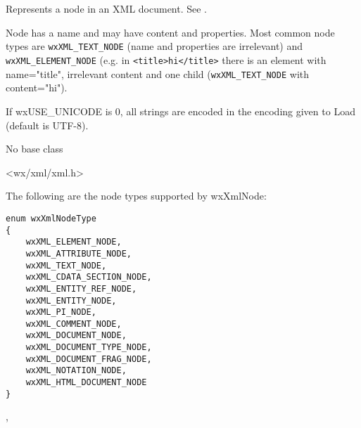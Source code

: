 \section{}\label{wxxmlnode}

Represents a node in an XML document. See .

Node has a name and may have content
and properties. Most common node types are {\tt wxXML\_TEXT\_NODE} (name and
properties are irrelevant) and {\tt wxXML\_ELEMENT\_NODE} (e.g. in {\tt <title>hi</title>} there is
an element with name="title", irrelevant content and one child ({\tt wxXML\_TEXT\_NODE}
with content="hi").

If wxUSE\_UNICODE is 0, all strings are encoded in the encoding given to Load
(default is UTF-8).



No base class


<wx/xml/xml.h>


The following are the node types supported by wxXmlNode:

{\small
\begin{verbatim}
enum wxXmlNodeType
{
    wxXML_ELEMENT_NODE,
    wxXML_ATTRIBUTE_NODE,
    wxXML_TEXT_NODE,
    wxXML_CDATA_SECTION_NODE,
    wxXML_ENTITY_REF_NODE,
    wxXML_ENTITY_NODE,
    wxXML_PI_NODE,
    wxXML_COMMENT_NODE,
    wxXML_DOCUMENT_NODE,
    wxXML_DOCUMENT_TYPE_NODE,
    wxXML_DOCUMENT_FRAG_NODE,
    wxXML_NOTATION_NODE,
    wxXML_HTML_DOCUMENT_NODE
}
\end{verbatim}
}


, 




\label{wxxmlnodewxxmlnode}





